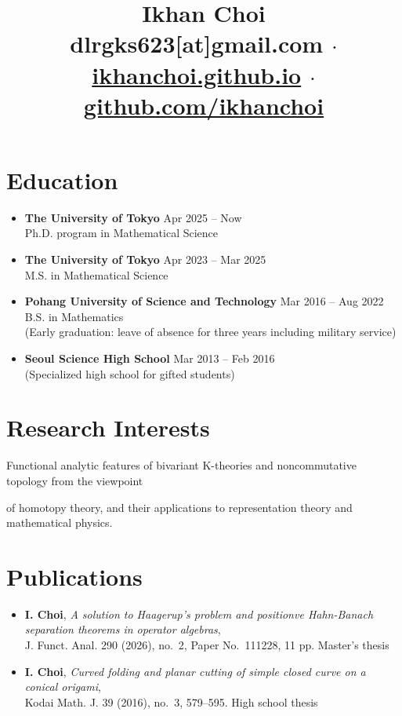 \documentclass[11pt,a4paper]{article}
\title{\vspace{-40pt}
	Ikhan Choi\\[5pt]\small
	\faEnvelopeSquare\quad dlrgks623[at]gmail.com
	\quad$\cdot$\quad
	\faHome\quad\href{https://ikhanchoi.github.io}{ikhanchoi.github.io}
	\quad$\cdot$\quad
	\faGithub\quad\href{https://github.com/ikhanchoi}{github.com/ikhanchoi}
	\vspace{-5em}}
\date{}
\begin{document}
\maketitle

\section*{Education}
\begin{itemize}
\item
	\textbf{The University of Tokyo}
	\hfill{\small Apr 2025 -- Now}\\
	Ph.D. program in Mathematical Science
\item
	\textbf{The University of Tokyo}
	\hfill{\small Apr 2023 -- Mar 2025}\\
	M.S. in Mathematical Science
\item
	\textbf{Pohang University of Science and Technology}
	\hfill{\small Mar 2016 -- Aug 2022}\\
	B.S. in Mathematics\\
	(Early graduation: leave of absence for three years including military service)
\item
	\textbf{Seoul Science High School}
	\hfill{\small Mar 2013 -- Feb 2016}\\
	(Specialized high school for gifted students)
\end{itemize}



\section*{Research Interests}
\hspace{2em}
Functional analytic features of bivariant K-theories and noncommutative topology from the viewpoint\par\hspace{2em}
of homotopy theory, and their applications to representation theory and mathematical physics.



\section*{Publications}
\begin{itemize}
\item
	\textbf{I. Choi},
	\emph{A solution to Haagerup's problem and positionve Hahn-Banach separation theorems in operator algebras},\\
	J. Funct. Anal. 290 (2026), no.~2, Paper No.~111228, 11 pp.
	\hfill{\small Master's thesis}
\item
	\textbf{I. Choi},
	\emph{Curved folding and planar cutting of simple closed curve on a conical origami},\\
	Kodai Math. J. 39 (2016), no.~3, 579--595.
	\hfill{\small High school thesis}
\end{itemize}
\end{document}
